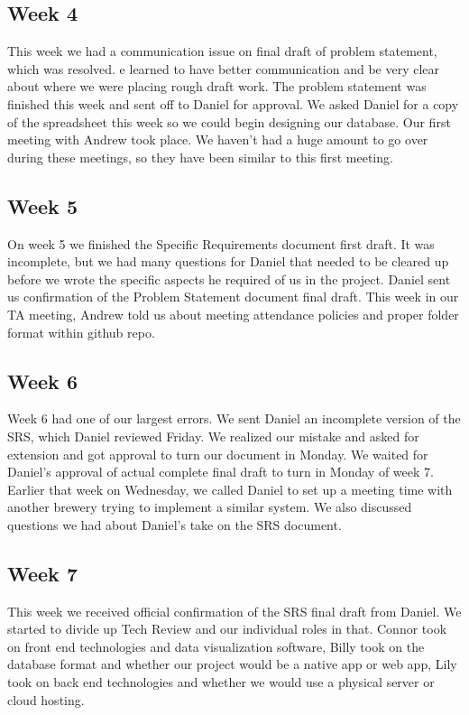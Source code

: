 \documentclass[draftclsnofoot,onecolumn,letterpaper,10pt,compsoc]{IEEEtran}
\begin{document}
\subsection{Week 4}
This week we had a communication issue on final draft of problem statement, which was resolved.
e learned to have better communication and be very clear about where we were placing rough draft work.
The problem statement was finished this week and sent off to Daniel for approval.
We asked Daniel for a copy of the spreadsheet this week so we could begin designing our database.
Our first meeting with Andrew took place. We haven’t had a huge amount to go over during these meetings, so they have been similar to this first meeting.
\subsection{Week 5}
On week 5 we finished the Specific Requirements document first draft.
It was incomplete, but we had many questions for Daniel that needed to be cleared up before we wrote the specific aspects he required of us in the project.
Daniel sent us confirmation of the Problem Statement document final draft.
This week in our TA meeting, Andrew told us about meeting attendance policies and proper folder format within github repo.
\subsection{Week 6}
Week 6 had one of our largest errors.
We sent Daniel an incomplete version of the SRS, which Daniel reviewed Friday.
We realized our mistake and asked for extension and got approval to turn our document in Monday.
We waited for Daniel’s approval of actual complete final draft to turn in Monday of week 7.
Earlier that week on Wednesday, we called Daniel to set up a meeting time with another brewery trying to implement a similar system.
We also discussed questions we had about Daniel’s take on the SRS document.
\subsection{Week 7}
This week we received official confirmation of the SRS final draft from Daniel.
We started to divide up Tech Review and our individual roles in that.
Connor took on front end  technologies and data visualization software, Billy took on the database format and whether our project would be a native app or web app, Lily took on back end technologies and whether we would use a physical server or cloud hosting.
\end{document}

